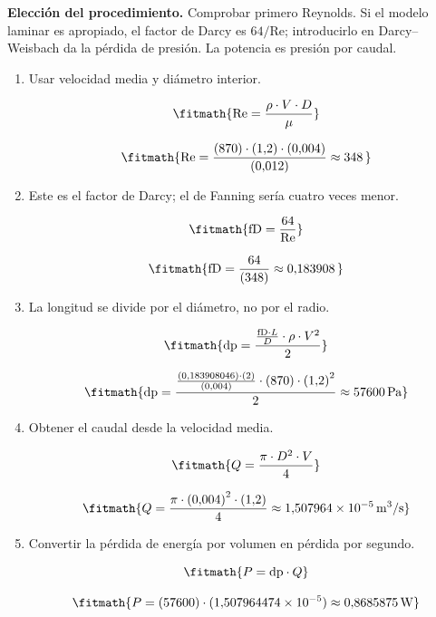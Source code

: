\noindent\textbf{Elección del procedimiento.} Comprobar primero Reynolds. Si el modelo laminar es apropiado, el factor de Darcy es $64/\mathrm{Re}$; introducirlo en Darcy--Weisbach da la pérdida de presión. La potencia es presión por caudal.

\begin{enumerate}

\item Usar velocidad media y diámetro interior.

\[\fitmath{\mathrm{Re}=\frac{\rho\cdot V\cdot D}{\mu}}\]

\[\fitmath{\mathrm{Re}=\frac{(870)\cdot (1{,}2)\cdot (0{,}004)}{(0{,}012)}\approx 348\,}\]

\item Este es el factor de Darcy; el de Fanning sería cuatro veces menor.

\[\fitmath{\mathrm{fD}=\frac{64}{\mathrm{Re}}}\]

\[\fitmath{\mathrm{fD}=\frac{64}{(348)}\approx 0{,}183908\,}\]

\item La longitud se divide por el diámetro, no por el radio.

\[\fitmath{\mathrm{dp}=\frac{\frac{\mathrm{fD}\cdot L}{D}\cdot \rho\cdot {V}^{2}}{2}}\]

\[\fitmath{\mathrm{dp}=\frac{\frac{(0{,}183908046)\cdot (2)}{(0{,}004)}\cdot (870)\cdot {(1{,}2)}^{2}}{2}\approx 57600\,\mathrm{Pa}}\]

\item Obtener el caudal desde la velocidad media.

\[\fitmath{Q=\frac{\pi\cdot {D}^{2}\cdot V}{4}}\]

\[\fitmath{Q=\frac{\pi\cdot {(0{,}004)}^{2}\cdot (1{,}2)}{4}\approx 1{,}507964\times10^{-5}\,\mathrm{m^{3}/s}}\]

\item Convertir la pérdida de energía por volumen en pérdida por segundo.

\[\fitmath{P=\mathrm{dp}\cdot Q}\]

\[\fitmath{P=(57600)\cdot (1{,}507964474\times10^{-5})\approx 0{,}8685875\,\mathrm{W}}\]

\end{enumerate}
